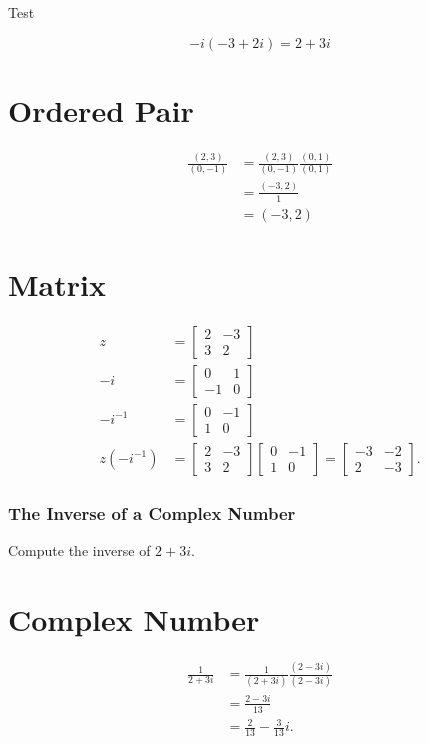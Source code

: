 Test

$$
-i(-3+2 i)=2+3 i
$$

\section{Ordered Pair}
$$
\begin{aligned}
\frac{(2,3)}{(0,-1)} & =\frac{(2,3)}{(0,-1)} \frac{(0,1)}{(0,1)} \\
& =\frac{(-3,2)}{1} \\
& =(-3,2)
\end{aligned}
$$

\section{Matrix}
$$
\begin{aligned}
z & =\left[\begin{array}{cc}
2 & -3 \\
3 & 2
\end{array}\right] \\
-i & =\left[\begin{array}{cc}
0 & 1 \\
-1 & 0
\end{array}\right] \\
-i^{-1} & =\left[\begin{array}{cc}
0 & -1 \\
1 & 0
\end{array}\right] \\
z\left(-i^{-1}\right) & =\left[\begin{array}{cc}
2 & -3 \\
3 & 2
\end{array}\right]\left[\begin{array}{cc}
0 & -1 \\
1 & 0
\end{array}\right]=\left[\begin{array}{cc}
-3 & -2 \\
2 & -3
\end{array}\right] .
\end{aligned}
$$

\subsubsection{The Inverse of a Complex Number}
Compute the inverse of $2+3 i$.

\section{Complex Number}
$$
\begin{aligned}
\frac{1}{2+3 i} & =\frac{1}{(2+3 i)} \frac{(2-3 i)}{(2-3 i)} \\
& =\frac{2-3 i}{13} \\
& =\frac{2}{13}-\frac{3}{13} i .
\end{aligned}
$$

